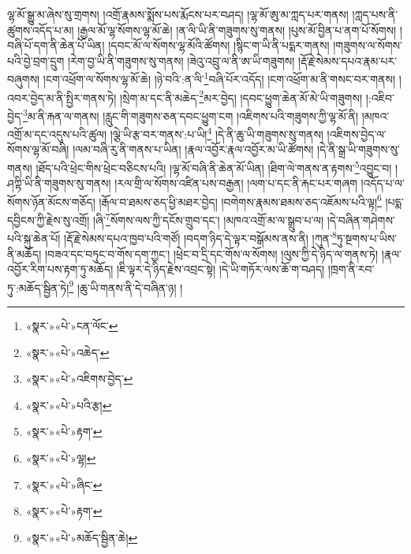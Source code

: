 ལྷ་མོ་སྒྱུ་མ་ཞེས་སུ་གྲགས། །འགྲོ་རྣམས་སྨོས་པས་རྨོངས་པར་བཤད། །ལྷ་མོ་ཨུ་མ་ཀླད་པར་གནས། །ཀླད་པས་ནི་ཚུགས་འདོད་པ་མ། །རྒྱལ་མོ་ལྷ་སོགས་ལྷ་མོ་ཆེ། །ན་ལི་ཡི་ནི་གཟུགས་སུ་གནས། །པུས་མོ་བྱིན་པ་ནག་པོ་སོགས། །བཞི་པོ་དག་ནི་ཆེན་པོ་ཡིན། །དབང་མོ་ལ་སོགས་ལྷ་མོའི་ཚོགས། །སྙིང་ག་ཡི་ནི་པདྨར་གནས། །གཟུགས་ལ་སོགས་པའི་བྱེ་བྲག་དྲུག །རེག་བྱ་ཡི་ནི་གཟུགས་སུ་གནས། །ཟེའུ་འབྲུ་ལ་ནི་ཨ་ཡི་གཟུགས། །རྡོ་རྗེ་སེམས་དཔའ་རྣམ་པར་བཞུགས། །ངག་འཕྲོག་ལ་སོགས་ལྷ་མོ་ཆེ། །ཉེ་བའི་:ན་ལི་\footnote{«སྣར་»«པེ་»ངན་ལོང་}བཞི་པོར་འདོད། །ངག་འཕྲོག་མ་ནི་གསང་བར་གནས། །འབར་བྱེད་མ་ནི་སྤྱིར་གནས་ཏེ། །སྲེག་མ་དང་ནི་མཆེད་\footnote{«སྣར་»«པེ་»འཆེད་}མར་བྱེད། །དབང་ཕྱུག་ཆེན་མོ་མེ་ཡི་གཟུགས། །:འཇིབ་བྱེད་\footnote{«སྣར་»«པེ་»འཇིགས་བྱེད་}མ་ནི་རྐན་ལ་གནས། །རླུང་གི་གཟུགས་ཅན་དབང་ཕྱུག་ངག །འཇིགས་པའི་གཟུགས་ཀྱི་ལྷ་མོ་ནི། །མཁའ་འགྲོ་མ་དང་འདུས་པའི་ཚུལ། །ལྕེ་ཡི་རྩ་བར་གནས་:པ་ཡི།\footnote{«སྣར་»«པེ་»པའི་རྩ།} །དེ་ནི་ཆུ་ཡི་གཟུགས་སུ་གནས། །འཇིགས་བྱེད་ལ་སོགས་ལྷ་མོ་བཞི། །ལམ་བཞི་རུ་ནི་གནས་པ་ཡིན། །རྣལ་འབྱོར་རྣལ་འབྱོར་མ་ཡི་ཚོགས། །དེ་ནི་སྒྲ་ཡི་གཟུགས་སུ་གནས། །ཐོད་པའི་ཕྲེང་གིས་ཕྲེང་བཅིངས་པའི། །ལྷ་མོ་བཞི་ནི་ཆེན་མོ་ཡིན། །ཐིག་ལེ་གནས་ན་རྟགས་\footnote{«སྣར་»«པེ་»རྟག་}འབྱུང་བ། །ཤཀྟི་ཡི་ནི་གཟུགས་སུ་གནས། །རལ་གྲི་ལ་སོགས་འཛིན་པས་བརྒྱན། །ལག་པ་དང་ནི་རྐང་པར་གཞག །འདོད་པ་ལ་སོགས་ཉོན་མོངས་གཅོད། །རྒོལ་བ་ཐམས་ཅད་ཕྱི་མཐར་བྱེད། །བགེགས་རྣམས་ཐམས་ཅད་འཇོམས་པའི་ལྟ།\footnote{«སྣར་»«པེ་»ལྷ།} །པདྨ་དབྱིངས་ཀྱི་རྗེས་སུ་འགྲོ། །ཞི་\footnote{«སྣར་»«པེ་»ཞིང་}སོགས་ལས་ཀྱི་དངོས་གྲུབ་དང་། །མཁའ་འགྲོ་མ་ལ་སྒྲུབ་པ་ལ། །དེ་བཞིན་གཤེགས་པའི་སྐུ་ཆེན་པོ། །རྡོ་རྗེ་སེམས་དཔའ་ཁྱབ་པའི་གཙོ། །བདག་ཉིད་དེ་ལྟར་བསྒོམས་ནས་ནི། །ཀུན་\footnote{«སྣར་»«པེ་»རྟག་}ཏུ་སྔགས་པ་ཡིས་ནི་མཆོད། །བཟའ་དང་བཏུང་བ་གོས་དག་ཀྱང་། །ཕྲེང་བ་དྲི་དང་གོས་ལ་སོགས། །ལུས་ཀྱི་དེ་ཉིད་ལ་གནས་ཏེ། །རྣལ་འབྱོར་རིག་པས་རྟག་ཏུ་མཆོད། །ཇི་ལྟར་དེ་ཉིད་རྗེས་འབྲང་སྟེ། །དེ་ཡི་གཏོར་ལས་ཆོ་ག་བཤད། །ཁྲག་ནི་རབ་ཏུ་:མཆོད་སྦྱིན་ཏེ།\footnote{«སྣར་»«པེ་»མཆོད་སྦྱིན་ཆེ།} །ཆུ་ཡི་གནས་ནི་དེ་བཞིན་ཉ། །
